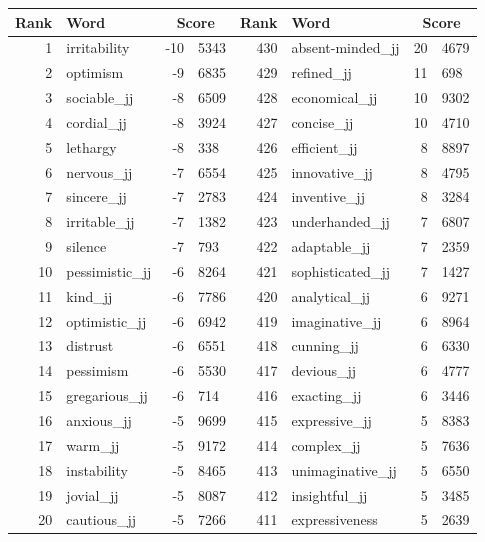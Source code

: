 \begin{table}[tbp]
    \begin{tabular}{| rlr@{.}l | rlr@{.}l |}
    \hline
    \textbf{Rank} & \textbf{Word} & \multicolumn{2}{c|}{\textbf{Score}} & \textbf{Rank} & \textbf{Word} & \multicolumn{2}{c|}{\textbf{Score}} \\
    \hline
    1 & irritability & -10 & 5343    &    430 & absent-minded\_jj & 20 & 4679 \\
    2 & optimism & -9 & 6835    &    429 & refined\_jj & 11 & 698 \\
    3 & sociable\_jj & -8 & 6509    &    428 & economical\_jj & 10 & 9302 \\
    4 & cordial\_jj & -8 & 3924    &    427 & concise\_jj & 10 & 4710 \\
    5 & lethargy & -8 & 338    &    426 & efficient\_jj & 8 & 8897 \\
    6 & nervous\_jj & -7 & 6554    &    425 & innovative\_jj & 8 & 4795 \\
    7 & sincere\_jj & -7 & 2783    &    424 & inventive\_jj & 8 & 3284 \\
    8 & irritable\_jj & -7 & 1382    &    423 & underhanded\_jj & 7 & 6807 \\
    9 & silence & -7 & 793    &    422 & adaptable\_jj & 7 & 2359 \\
    10 & pessimistic\_jj & -6 & 8264    &    421 & sophisticated\_jj & 7 & 1427 \\
    11 & kind\_jj & -6 & 7786    &    420 & analytical\_jj & 6 & 9271 \\
    12 & optimistic\_jj & -6 & 6942    &    419 & imaginative\_jj & 6 & 8964 \\
    13 & distrust & -6 & 6551    &    418 & cunning\_jj & 6 & 6330 \\
    14 & pessimism & -6 & 5530    &    417 & devious\_jj & 6 & 4777 \\
    15 & gregarious\_jj & -6 & 714    &    416 & exacting\_jj & 6 & 3446 \\
    16 & anxious\_jj & -5 & 9699    &    415 & expressive\_jj & 5 & 8383 \\
    17 & warm\_jj & -5 & 9172    &    414 & complex\_jj & 5 & 7636 \\
    18 & instability & -5 & 8465    &    413 & unimaginative\_jj & 5 & 6550 \\
    19 & jovial\_jj & -5 & 8087    &    412 & insightful\_jj & 5 & 3485 \\
    20 & cautious\_jj & -5 & 7266    &    411 & expressiveness & 5 & 2639 \\

\end{tabular}
\end{table}
